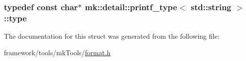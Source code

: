 \subsubsection[{\texorpdfstring{type}{type}}]{\setlength{\rightskip}{0pt plus 5cm}typedef const char$\ast$ {\bf mk\+::detail\+::printf\+\_\+type}$<$ std\+::string $>$\+::{\bf type}}\hypertarget{structmk_1_1detail_1_1printf__type_3_01std_1_1string_01_4_aefe1f893104e234da2167836c168deef}{}\label{structmk_1_1detail_1_1printf__type_3_01std_1_1string_01_4_aefe1f893104e234da2167836c168deef}


The documentation for this struct was generated from the following file\+:\begin{DoxyCompactItemize}
\item 
framework/tools/mk\+Tools/\hyperlink{format_8h}{format.\+h}\end{DoxyCompactItemize}
